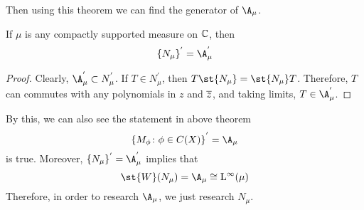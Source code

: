 Then using this theorem we can find the generator of $\A_{\mu}$.
\begin{thm}
	If $\mu$ is any compactly supported measure on $\mathbb{C}$, then
	\begin{equation*}
		\{N_{\mu}\}^{'} = \A_{\mu}^{'}
	\end{equation*}
\end{thm}
\begin{proof}
	Clearly, $\A_{\mu}^{'} \subset N_{\mu}^{'}$. If $T \in N_{\mu}^{'}$, then $T\st{N_{\mu}} = \st{N_{\mu}}T$. Therefore, $T$ can commutes with any polynomials in $z$ and $\overline{z}$, and taking limits, $T \in \A_{\mu}^{'}$.
\end{proof}
\begin{rem}
	By this, we can also see the statement in above theorem
	\begin{equation*}
		{\{M_{\phi} \colon \phi \in C(X)\}}^{'} = \A_{\mu}
	\end{equation*}
	is true. Moreover, $\{N_{\mu}\}^{'} = \A_{\mu}^{'}$ implies that
	\begin{equation*}
		\st{W}(N_{\mu}) = \A_{\mu} \cong \lfs{\infty}(\mu)
	\end{equation*}
	Therefore, in order to research $\A_{\mu}$, we just research $N_{\mu}$.
\end{rem}


